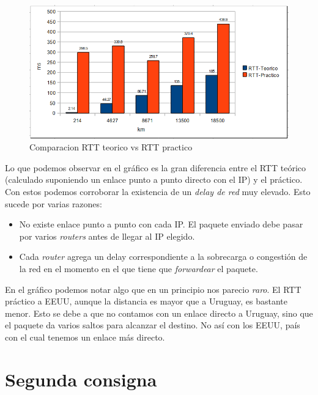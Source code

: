 \documentclass[a4paper]{article}
\begin{document}
\begin{figure}[H]
  \centering
  \includegraphics[scale=0.60]{graficos/comparacionRTT.png}
  \caption{Comparacion RTT teorico vs RTT practico }
\end{figure}


Lo que podemos observar en el gráfico es la gran diferencia entre el RTT teórico (calculado suponiendo un enlace punto a punto directo con el IP) y el práctico. Con estos podemos corroborar la existencia de un \textit{delay de red} muy elevado. Esto sucede por varias razones:
\begin{itemize}
	\item No existe enlace punto a punto con cada IP. El paquete enviado debe pasar por varios \textit{routers} antes de llegar al IP elegido.
	\item Cada \textit{router} agrega un delay correspondiente a la sobrecarga o congestión de la red en el momento en el que tiene que \textit{forwardear} el paquete. 
\end{itemize}

En el gráfico podemos notar algo que en un principio nos parecio \textit{raro}. El RTT práctico a EEUU, aunque la distancia es mayor que a Uruguay, es bastante menor. Esto se debe a que no contamos con un enlace directo a Uruguay, sino que el paquete da varios saltos para alcanzar el destino. No así con los EEUU, país con el cual tenemos un enlace más directo.  



\section{Segunda consigna}
\end{document}
